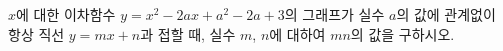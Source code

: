 $x$에 대한 이차함수 $y=x^2-2ax+a^2-2a+3$의 그래프가 실수 $a$의 값에 관계없이 항상 직선 $y=mx+n$과 접할 때, 실수 $m$, $n$에 대하여 $mn$의 값을 구하시오.
